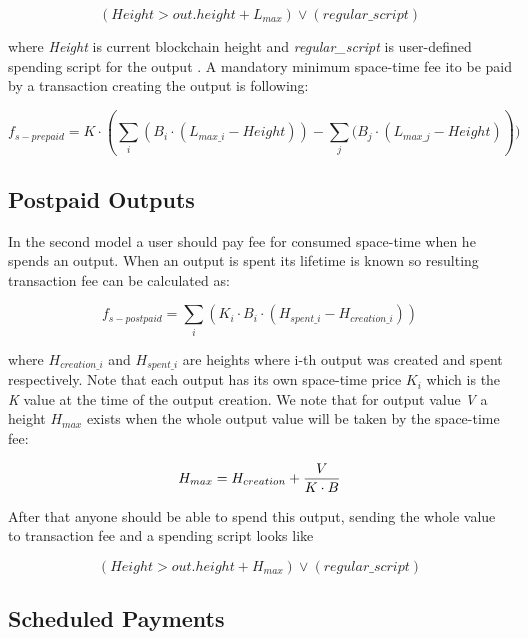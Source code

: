 \documentclass[]{llncs}   %
\newcommand{\authnote}[2]{\marginpar{\parbox{\marginparwidth}{\tiny %
  \textsf{#1 {\textcolor{blue}{notes: #2}}}}}%
  \textcolor{blue}{\textbf{\dag}}}
\newcommand{\authnote}[2]{
  \textsf{#1 \textcolor{blue}{: #2}}}
\newcommand{\authnote}[2]{}
\newcommand{\knote}[1]{{\authnote{\textcolor{green}{Alex notes}}{#1}}}
\newcommand{\dnote}[1]{{\authnote{\textcolor{red}{Dima notes}}{#1}}}
\begin{document}
\begin{equation}
(Height > out.height + L_{max}) \lor (regular\_script)
\end{equation}

where \textit{Height} is current blockchain height and \textit{regular\_script} is user-defined spending script for the output\dnote{What is out.height?}. A mandatory minimum space-time fee ito be paid by a transaction creating the output is following:

\begin{equation}
f_{s-prepaid} = K \cdot (\sum_i{(B_i \cdot (L_{max\_i} - Height))} - \sum_j{(B_j \cdot (L_{max\_j} - Height)}))
\end{equation}

\knote{Height is subjective here, write about that}

\subsection{Postpaid Outputs}
\label{sec-postpaid}


In the second model a user should pay fee for consumed space-time when he spends an output. When an output is spent its lifetime is known so resulting transaction fee can be calculated as:

\begin{equation}
f_{s-postpaid} = \sum_i{(K_i \cdot B_i \cdot (H_{spent\_i} - H_{creation\_i}))}
\end{equation}

where $H_{creation\_i}$ and $H_{spent\_i}$ are heights where i-th output was created and spent respectively. Note that each output has its own space-time price \textit{$K_i$} which is the \textit{K} value at the time of the output creation. We note that for output value \textit{V} a height \textit{$H_{max}$} exists when the whole output value will be taken by the space-time fee:

\begin{equation}
H_{max} = {H_{creation} + {V \over {K \cdot B}}}
\end{equation}

After that anyone should be able to spend this output, sending the whole value to transaction fee and a spending script looks like

\begin{equation}
(Height > out.height + H_{max}) \lor (regular\_script)
\end{equation}


\subsection{Scheduled Payments}
\label{sec-scheduled}
\end{document}
